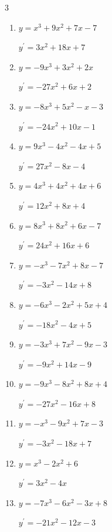 \begin{multicols}{3}
\begin{enumerate}
  \item $y=x^{3}+9x^{2}+7x-7$

        $\displaystyle y^{\prime}=3x^{2}+18x+7$

  \item $y=-9x^{3}+3x^{2}+2x$

        $\displaystyle y^{\prime}=-27x^{2}+6x+2$

  \item $y=-8x^{3}+5x^{2}-x-3$

        $\displaystyle y^{\prime}=-24x^{2}+10x-1$

  \item $y=9x^{3}-4x^{2}-4x+5$

        $\displaystyle y^{\prime}=27x^{2}-8x-4$

  \item $y=4x^{3}+4x^{2}+4x+6$

        $\displaystyle y^{\prime}=12x^{2}+8x+4$

  \item $y=8x^{3}+8x^{2}+6x-7$

        $\displaystyle y^{\prime}=24x^{2}+16x+6$

  \item $y=-x^{3}-7x^{2}+8x-7$

        $\displaystyle y^{\prime}=-3x^{2}-14x+8$

  \item $y=-6x^{3}-2x^{2}+5x+4$

        $\displaystyle y^{\prime}=-18x^{2}-4x+5$

\columnbreak %

  \item $y=-3x^{3}+7x^{2}-9x-3$

        $\displaystyle y^{\prime}=-9x^{2}+14x-9$

  \item $y=-9x^{3}-8x^{2}+8x+4$

        $\displaystyle y^{\prime}=-27x^{2}-16x+8$

  \item $y=-x^{3}-9x^{2}+7x-3$

        $\displaystyle y^{\prime}=-3x^{2}-18x+7$

  \item $y=x^{3}-2x^{2}+6$

        $\displaystyle y^{\prime}=3x^{2}-4x$

  \item $y=-7x^{3}-6x^{2}-3x+8$

        $\displaystyle y^{\prime}=-21x^{2}-12x-3$


\end{enumerate}
\end{multicols}
